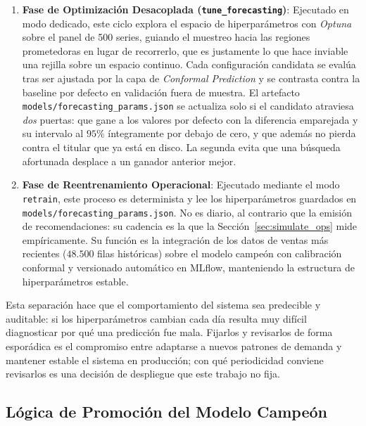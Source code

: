 \begin{enumerate}
    \item \begin{sloppypar}\textbf{Fase de Optimización Desacoplada (\texttt{tune\_forecasting})}: Ejecutado en modo dedicado, este ciclo explora el espacio de hiperparámetros con \textit{Optuna} sobre el panel de 500 series, guiando el muestreo hacia las regiones prometedoras en lugar de recorrerlo, que es justamente lo que hace inviable una rejilla sobre un espacio continuo. Cada configuración candidata se evalúa tras ser ajustada por la capa de \textit{Conformal Prediction} y se contrasta contra la baseline por defecto en validación fuera de muestra. El artefacto \texttt{models/forecasting\_params.json} se actualiza solo si el candidato atraviesa \emph{dos} puertas: que gane a los valores por defecto con la diferencia emparejada y su intervalo al $95\%$ íntegramente por debajo de cero, y que además no pierda contra el titular que ya está en disco. La segunda evita que una búsqueda afortunada desplace a un ganador anterior mejor.\end{sloppypar}
    \item \textbf{Fase de Reentrenamiento Operacional}: Ejecutado mediante el modo \texttt{retrain}, este proceso es determinista y lee los hiperparámetros guardados en \texttt{models/}\allowbreak\texttt{forecasting\_}\allowbreak\texttt{params.json}. No es diario, al contrario que la emisión de recomendaciones: su cadencia es la que la Sección~\ref{sec:simulate_ops} mide empíricamente. Su función es la integración de los datos de ventas más recientes ($48.500$ filas históricas) sobre el modelo campeón con calibración conformal y versionado automático en MLflow, manteniendo la estructura de hiperparámetros estable.\end{enumerate}

Esta separación hace que el comportamiento del sistema sea predecible y auditable: si los hiperparámetros cambian cada día resulta muy difícil diagnosticar por qué una predicción fue mala. Fijarlos y revisarlos de forma esporádica es el compromiso entre adaptarse a nuevos patrones de demanda y mantener estable el sistema en producción; con qué periodicidad conviene revisarlos es una decisión de despliegue que este trabajo no fija.

\subsection{Lógica de Promoción del Modelo Campeón}
\label{sec:champion_promotion}

